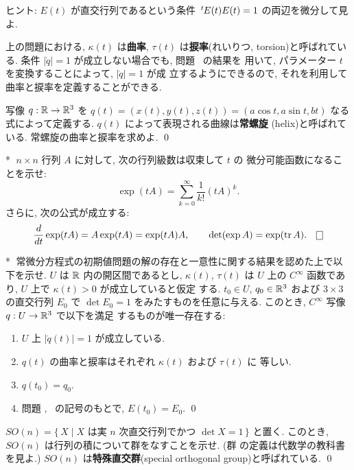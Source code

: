 \documentclass[12pt,twoside]{jarticle}
\def\qstar#1{$\!\!\!$#1$\;$}
\def\transposed#1{\,\vphantom{#1}^t\mskip-1.5mu{#1}} %
\begin{document}
\noindent ヒント: $E(t)$ が直交行列であるという条件 %
$\transposed{E(t)} E(t) = 1$ の両辺を微分して見よ. 

\noindent 上の問題における, $\kappa(t)$ は{\bf 曲率}, %
$\tau(t)$ は{\bf 捩率}(れいりつ, torsion)と呼ばれている. %
条件 $|\dot{q}| = 1$ が成立しない場合でも, 問題 \ の結果を
用いて, パラメーター $t$ を変換することによって, $|\dot{q}| = 1$ が成
立するようにできるので, それを利用して曲率と捩率を定義することができる.

\begin{question}[常螺旋]\label{q:helix}
  写像 $q : {\mathbb R} \to {\mathbb R}^3$ を %
  $q(t) = (x(t), y(t), z(t)) = (a \cos t, a \sin t, b t)$ %
  なる式によって定義する. $q(t)$ によって表現される曲線は{\bf 常螺旋}
  (helix)と呼ばれている. 常螺旋の曲率と捩率を求めよ. \qed
\end{question}

\begin{question}[行列の指数函数]\label{q:mat-exp}\qstar{*}
  $n \times n$ 行列 $A$ に対して, 次の行列級数は収束して $t$ の %
  微分可能函数になることを示せ:
  \[
    \exp(tA) = \sum_{k=0}^\infty \frac{1}{k!} (tA)^k.
  \]
  さらに, 次の公式が成立する:
  \[
    \frac{d}{dt} \exp(tA) = A \exp(tA) = \exp(tA) A,
    \qquad
    \det(\exp A) = \exp(\trace A).
  \qed
  \]
\end{question}

\begin{question}[曲線論の基本定理]\qstar{*}
  常微分方程式の初期値問題の解の存在と一意性に関する結果を認めた上で以
  下を示せ. %
  $U$ は ${\mathbb R}$ 内の開区間であるとし, $\kappa(t)$, $\tau(t)$ は $U$ 上の
  $C^\infty$ 函数であり, $U$ 上で $\kappa(t) > 0$ が成立していると仮定
  する. $t_0 \in U$, $q_0 \in {\mathbb R}^3$ および $3 \times 3$ の直交行列 %
  $E_0$ で $\det E_0 = 1$ をみたすものを任意に与える. このとき, 
  $C^\infty$ 写像 $q : U \to {\mathbb R}^3$ で以下を満足
  するものが唯一存在する:
  \begin{enumerate}
  \item $U$ 上 $|\dot{q}(t)| = 1$ が成立している.
  \item $q(t)$ の曲率と捩率はそれぞれ $\kappa(t)$ および $\tau(t)$ に
    等しい.
  \item $q(t_0) = q_0$.
  \item 問題 , \ の記号のもとで, $E(t_0) = E_0$.
  \qed
  \end{enumerate}
\end{question}

\begin{question}
  \(
    SO(n)
    =
    \{\, X \mid \text{$X$ は実 $n$ 次直交行列でかつ $\det X = 1$} \,\}
  \) %
  と置く. このとき, $SO(n)$ は行列の積について群をなすことを示せ. (群
  の定義は代数学の教科書を見よ.) $SO(n)$ は{\bf 特殊直交群}(special
  orthogonal group)と呼ばれている. \qed
\end{question}
\end{document}
